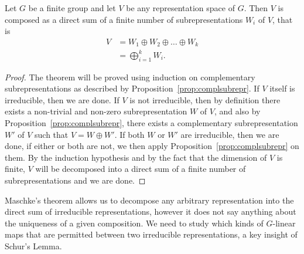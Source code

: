 \begin{theorem}\label{thm:maschkes}
	Let $G$ be a finite group and let $V$ be any representation space of $G$. Then $V$ is composed as a direct sum of a finite number of subrepresentations $W_i$ of $V$, that is
	\begin{align*}
		V &= W_1 \oplus W_2 \oplus \dots \oplus W_k \\
		&= \bigoplus_{i=1}^k W_i.
	\end{align*}
\end{theorem}
\begin{proof}
	The theorem will be proved using induction on complementary subrepresentations as described by Proposition~\ref{prop:complsubrepr}. If $V$ itself is irreducible, then we are done. If $V$ is not irreducible, then by definition there exists a non-trivial and non-zero subrepresentation $W$ of $V$, and also by Proposition~\ref{prop:complsubrepr}, there exists a complementary subrepresentation $W'$ of $V$ such that $V = W \oplus W'$. If both $W$ or $W'$ are irreducible, then we are done, if either or both are not, we then apply Proposition~\ref{prop:complsubrepr} on them. By the induction hypothesis and by the fact that the dimension of $V$ is finite, $V$ will be decomposed into a direct sum of a finite number of subrepresentations and we are done.
\end{proof}


Maschke's theorem allows us to decompose any arbitrary representation into the direct sum of irreducible representations, however it does not say anything about the uniqueness of a given composition. We need to study which kinds of $G$-linear maps that are permitted between two irreducible representations, a key insight of Schur's Lemma.

